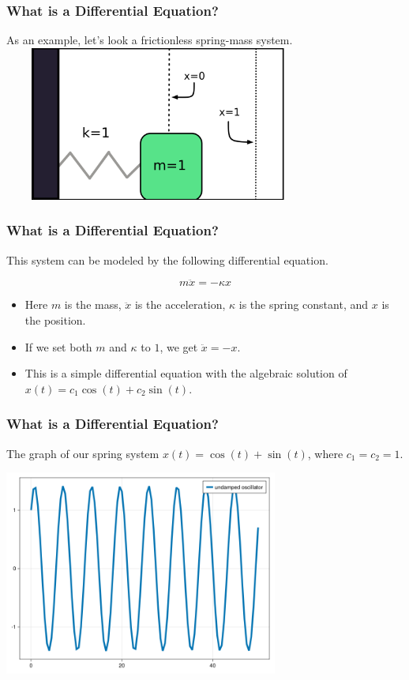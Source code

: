\documentclass{beamer}
\begin{document}
 

\begin{frame}
    \frametitle{What is a Differential Equation?}
    As an example, let's look a frictionless spring-mass system.\\
    \vspace*{0.125in}
    \includegraphics[height=2in, width=4in]{spring-mass diagram.png}
\end{frame}


\begin{frame}
    \frametitle{What is a Differential Equation?}
    This system can be modeled by the following differential equation.\\
    \vspace*{0.125in}
    \begin{Large}
        $$m\ddot{x}=-\kappa{x}$$
    \end{Large}
    \vspace*{0.25in}
    \begin{itemize}
        \item Here $m$ is the mass, $\ddot{x}$ is the acceleration, $\kappa$ is the spring constant, and $x$ is the position.
        \item If we set both $m$ and $\kappa$ to $1$, we get $\ddot{x}=-x$.
        \item This is a simple differential equation with the algebraic solution of $x(t)=c_1\cos(t)+c_2\sin(t)$.
    \end{itemize}
\end{frame}


\begin{frame}
    \frametitle{What is a Differential Equation?}
    The graph of our spring system $x(t)=\cos(t)+\sin(t)$, where $c_1=c_2=1$.\\
    \begin{center}
        \includegraphics[width=9cm]{undamped.png}
    \end{center}
\end{frame}
\end{document}
